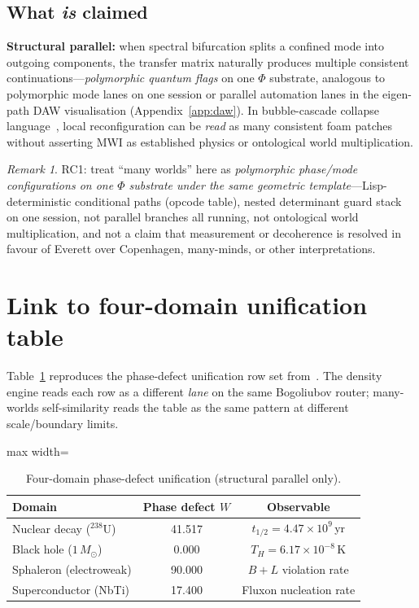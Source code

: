 \documentclass[11pt,a4paper]{article}
\theoremstyle{remark}
\newtheorem*{remark}{Remark}
\theoremstyle{definition}
\begin{document}
\subsection{What \emph{is} claimed}

\textbf{Structural parallel:} when spectral bifurcation splits a confined mode
into outgoing components, the transfer matrix naturally produces multiple
consistent continuations---\emph{polymorphic quantum flags} on one $\Phi$
substrate, analogous to polymorphic mode lanes on one session or parallel
automation lanes in the eigen-path DAW visualisation (Appendix~\ref{app:daw}).
In bubble-cascade collapse language~\cite{KFM2026}, local reconfiguration can
be \emph{read} as many consistent foam patches without asserting MWI as
established physics or ontological world multiplication.

\begin{remark}
RC1: treat ``many worlds'' here as \emph{polymorphic phase/mode configurations
on one $\Phi$ substrate under the same geometric template}---Lisp-deterministic
conditional paths (opcode table), nested determinant guard stack on one session,
not parallel branches all running, not ontological world multiplication, and not
a claim that measurement or decoherence
is resolved in favour of Everett over Copenhagen, many-minds, or other
interpretations.
\end{remark}

\section{Link to four-domain unification table}
\label{sec:unification}

Table~\ref{tab:unification} reproduces the phase-defect unification row set
from~\cite{FlagDecay2026}.  The density engine reads each row as a different
\emph{lane} on the same Bogoliubov router; many-worlds self-similarity reads
the table as the same pattern at different scale/boundary limits.

\begin{table}[H]
\centering
\caption{Four-domain phase-defect unification (structural parallel only).}
\label{tab:unification}
\small
\begin{adjustbox}{max width=\linewidth}\begin{tabular}{@{}lcc@{}}
\toprule
\textbf{Domain} & \textbf{Phase defect $W$} & \textbf{Observable} \\
\midrule
Nuclear decay ($^{238}\mathrm{U}$) & 41.517 & $t_{1/2}=4.47\times 10^9$\,yr \\
Black hole ($1\,M_\odot$) & 0.000 & $T_H=6.17\times 10^{-8}$\,K \\
Sphaleron (electroweak) & 90.000 & $B+L$ violation rate \\
Superconductor (NbTi) & 17.400 & Fluxon nucleation rate \\
\bottomrule
\end{tabular}\end{adjustbox}
\end{table}
\end{document}
